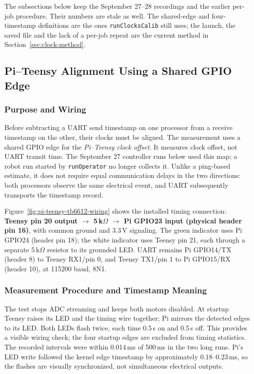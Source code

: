 The subsections below keep the September 27--28 recordings and the earlier per-job procedure. Their numbers are stale as well. The shared-edge and four-timestamp definitions are the ones \texttt{runClocksCalib} still uses; the launch, the saved file and the lack of a per-job repeat are the current method in Section~\ref{sec:clock-method}.

\subsection{Pi--Teensy Alignment Using a Shared GPIO Edge}
\subsubsection{Purpose and Wiring}
Before subtracting a UART send timestamp on one processor from a receive timestamp on the other, their clocks must be aligned. The measurement uses a shared GPIO edge for the \emph{Pi--Teensy clock offset}. It measures clock offset, not UART transit time. The September 27 controller runs below used this map; a robot run started by \texttt{runOperator} no longer collects it. Unlike a ping-based estimate, it does not require equal communication delays in the two directions: both processors observe the same electrical event, and UART subsequently transports the timestamp record.

Figure~\ref{fig:pi-teensy-tb6612-wiring} shows the installed timing connection: \textbf{Teensy pin 20 output $\rightarrow$ 5\,k$\Omega$ $\rightarrow$ Pi GPIO23 input (physical header pin 16)}, with common ground and 3.3\,V signaling. The green indicator uses Pi GPIO24 (header pin 18); the white indicator uses Teensy pin 21, each through a separate 5\,k$\Omega$ resistor to its grounded LED. UART remains Pi GPIO14/TX (header 8) to Teensy RX1/pin 0, and Teensy TX1/pin 1 to Pi GPIO15/RX (header 10), at 115200 baud, 8N1.

\subsubsection{Measurement Procedure and Timestamp Meaning}
The test stops ADC streaming and keeps both motors disabled. At startup Teensy raises its LED and the timing wire together; Pi mirrors the detected edges to its LED. Both LEDs flash twice, each time 0.5\,s on and 0.5\,s off. This provides a visible wiring check; the four startup edges are excluded from timing statistics. The recorded intervals were within 0.014\,ms of 500\,ms in the two long runs. Pi's LED write followed the kernel edge timestamp by approximately 0.18--0.23\,ms, so the flashes are visually synchronized, not simultaneous electrical outputs.

